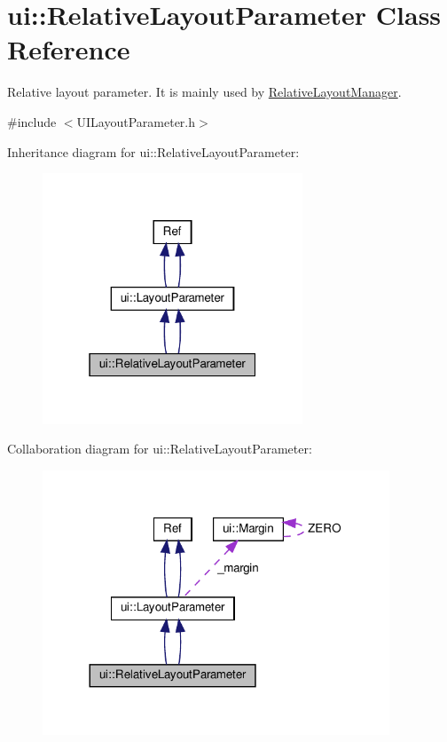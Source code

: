 \hypertarget{classui_1_1RelativeLayoutParameter}{}\section{ui\+:\+:Relative\+Layout\+Parameter Class Reference}
\label{classui_1_1RelativeLayoutParameter}


Relative layout parameter. It is mainly used by {\ttfamily \hyperlink{classui_1_1RelativeLayoutManager}{Relative\+Layout\+Manager}}.  




{\ttfamily \#include $<$U\+I\+Layout\+Parameter.\+h$>$}



Inheritance diagram for ui\+:\+:Relative\+Layout\+Parameter\+:
\nopagebreak
\begin{figure}[H]
\begin{center}
\leavevmode
\includegraphics[width=220pt]{classui_1_1RelativeLayoutParameter__inherit__graph}
\end{center}
\end{figure}


Collaboration diagram for ui\+:\+:Relative\+Layout\+Parameter\+:
\nopagebreak
\begin{figure}[H]
\begin{center}
\leavevmode
\includegraphics[width=293pt]{classui_1_1RelativeLayoutParameter__coll__graph}
\end{center}
\end{figure}
